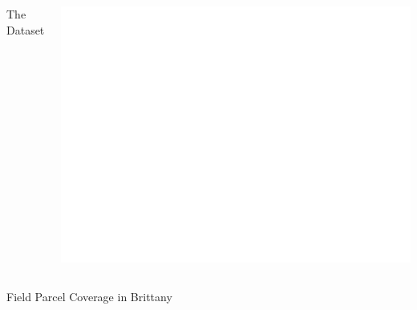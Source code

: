 \documentclass[%
  aspectratio=169,
  9pt,
  USenglish,
  titlegraphic, %
  affiliationintitlepagehead,
  progressbar,
]{beamer}
\begin{document}
{
	\begin{frame}[plain]
	
	\vfill
	\Huge\color{white}
	\begin{center}
		\begin{columns}
			\vspace{7em}
			
			\hfill 
			The Dataset
			
			\includegraphics[width=\textwidth]{images/map/breizh_white}
		\end{columns}
		\small\raggedleft Field Parcel Coverage in Brittany
	\end{center}
	
	\vfill
\end{frame}
}
\end{document}
